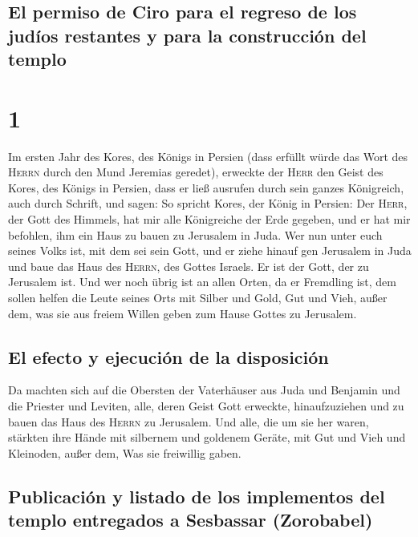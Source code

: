 \hypertarget{el-permiso-de-ciro-para-el-regreso-de-los-juduxedos-restantes-y-para-la-construcciuxf3n-del-templo}{%
\subsection{El permiso de Ciro para el regreso de los judíos restantes y
para la construcción del
templo}\label{el-permiso-de-ciro-para-el-regreso-de-los-juduxedos-restantes-y-para-la-construcciuxf3n-del-templo}}

\hypertarget{section}{%
\section{1}\label{section}}

 Im ersten Jahr des Kores, des Königs in Persien (dass
erfüllt würde das Wort des \textsc{Herrn} durch den Mund Jeremias
geredet), erweckte der \textsc{Herr} den Geist des Kores, des Königs in
Persien, dass er ließ ausrufen durch sein ganzes Königreich, auch durch
Schrift, und sagen:  So spricht Kores, der König in
Persien: Der \textsc{Herr}, der Gott des Himmels, hat mir alle
Königreiche der Erde gegeben, und er hat mir befohlen, ihm ein Haus zu
bauen zu Jerusalem in Juda.  Wer nun unter euch seines
Volks ist, mit dem sei sein Gott, und er ziehe hinauf gen Jerusalem in
Juda und baue das Haus des \textsc{Herrn}, des Gottes Israels. Er ist
der Gott, der zu Jerusalem ist.  Und wer noch übrig ist an
allen Orten, da er Fremdling ist, dem sollen helfen die Leute seines
Orts mit Silber und Gold, Gut und Vieh, außer dem, was sie aus freiem
Willen geben zum Hause Gottes zu Jerusalem.

\hypertarget{el-efecto-y-ejecuciuxf3n-de-la-disposiciuxf3n}{%
\subsection{El efecto y ejecución de la
disposición}\label{el-efecto-y-ejecuciuxf3n-de-la-disposiciuxf3n}}

 Da machten sich auf die Obersten der Vaterhäuser aus Juda
und Benjamin und die Priester und Leviten, alle, deren Geist Gott
erweckte, hinaufzuziehen und zu bauen das Haus des \textsc{Herrn} zu
Jerusalem.  Und alle, die um sie her waren, stärkten ihre
Hände mit silbernem und goldenem Geräte, mit Gut und Vieh und Kleinoden,
außer dem, Was sie freiwillig gaben.

\hypertarget{publicaciuxf3n-y-listado-de-los-implementos-del-templo-entregados-a-sesbassar-zorobabel}{%
\subsection{Publicación y listado de los implementos del templo
entregados a Sesbassar
(Zorobabel)}\label{publicaciuxf3n-y-listado-de-los-implementos-del-templo-entregados-a-sesbassar-zorobabel}}

